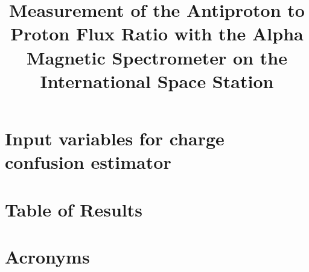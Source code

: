 \documentclass[11pt, a4paper]{report}  %
\title{\textbf{\huge{Measurement of the Antiproton to Proton Flux Ratio with the Alpha Magnetic Spectrometer on the International Space Station}}}
\begin{document}
\thispagestyle{empty}
\maketitle     
  

\newpage

\thispagestyle{empty}

\newpage
   
{\hypersetup{linkcolor=blue}
\tableofcontents}
\clearpage


\begin{mainf} %
 
\setlength{\baselineskip}{14.3pt} %






    
            


    
  

\end{mainf}

\begin{appendices}
\chapter{Input variables for charge confusion estimator}
  
\chapter{Table of Results}
   
\chapter{Acronyms}
   
\end{appendices}
\clearpage
\end{document}
